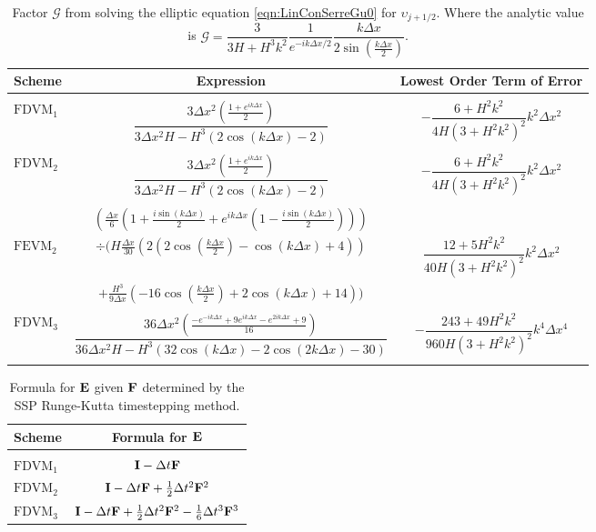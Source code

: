\begin{table}
	\centering   
	\begin{tabular}{l  c  c}
		Scheme& Expression& Lowest Order Term of Error\\
		\hline && \\
		$\text{FDVM}_1$& $\dfrac{3 \Delta x^2 \left(\frac{1 + e^{ik\Delta x}}{2}\right)}{3 \Delta x^2 H - H^3 \left(2\cos\left(k\Delta x\right) - 2\right)}$ & $-\dfrac{6 +H^2k^2}{4H \left(3 + H^2k^2\right)^2}k^2 \Delta x^2$ \\ & & \\
		$\text{FDVM}_2$& $\dfrac{3 \Delta x^2 \left(\frac{1 + e^{ik\Delta x}}{2}\right)}{3 \Delta x^2 H - H^3 \left(2\cos\left(k\Delta x\right) - 2\right)}$ & $-\dfrac{6 +H^2k^2}{4H \left(3 + H^2k^2\right)^2}k^2 \Delta x^2$ \\ & & \\
		& $\left(\frac{\Delta x}{6} \left(1 + \frac{i \sin\left(k \Delta x\right)}{2} + e^{ik\Delta x}\left(1 - \frac{i \sin\left(k \Delta x\right)}{2}\right) \right)\right)$ & \\  $\text{FEVM}_2$ & $\div  \Bigg(H\frac{\Delta x}{30} \left( 2\left(2\cos\left(\frac{k \Delta x}{2}\right) - \cos\left({k \Delta x}\right) + 4\right)  \right)$  & $\dfrac{12 + 5H^2k^2}{40H \left(3 + H^2k^2\right)^2}k^2 \Delta x^2$ \\ &$+ \frac{H^3 }{9\Delta x}\left(-16\cos\left(\frac{k\Delta x}{2}\right) + 2 \cos\left(k \Delta x\right) + 14\right)    \Bigg)$ & \\ & & \\
		$\text{FDVM}_3$&  $\dfrac{36 \Delta x^2 \left(\frac{-e^{-ik\Delta x} + 9e^{ik\Delta x} - e^{2ik\Delta x} + 9}{16}\right)}{36 \Delta x^2H - H^3\left(32\cos\left(k \Delta x\right) -2\cos\left(2k \Delta x\right) - 30\right)}$ & $-\dfrac{243 + 49H^2k^2}{960H\left(3 + H^2k^2\right)^2}k^4 \Delta x^4$ \\ & & \\ 
	\end{tabular}
	\caption{Factor $\mathcal{G}$ from solving the elliptic equation \eqref{eqn:LinConSerreGu0} for $\upsilon_{j+1/2}$. Where the analytic value is  $\mathcal{G} = \dfrac{3}{3H + H^3k^2} \dfrac{1}{e^{-ik\Delta x/2}} \dfrac{k\Delta x}{2 \sin\left(\frac{k \Delta x}{2}\right)}$.}
	\label{tab:Gfactor} 
\end{table}


\begin{table}
	\centering
	\begin{tabular}{l  c}
		Scheme& Formula for $\mathbf{E}$\\
		\hline &\\
		$\text{FDVM}_1$& $\mathbf{I} - \Delta t\mathbf{F} $ \\
		$\text{FDVM}_2$& $ \mathbf{I}  -\Delta t\mathbf{F} + \frac{1}{2}\Delta t^2\mathbf{F}^2$ \\
		$\text{FDVM}_3$& $\mathbf{I} -\Delta t\mathbf{F} + \frac{1}{2}\Delta t^2 \mathbf{F}^2 - \frac{1}{6}\Delta t^3 \mathbf{F}^3 $ \\
	\end{tabular}
	\caption{Formula for $\mathbf{E}$ given $\mathbf{F}$ determined by the SSP Runge-Kutta timestepping method.}
	\label{tab:RKstepfactor}
\end{table}

